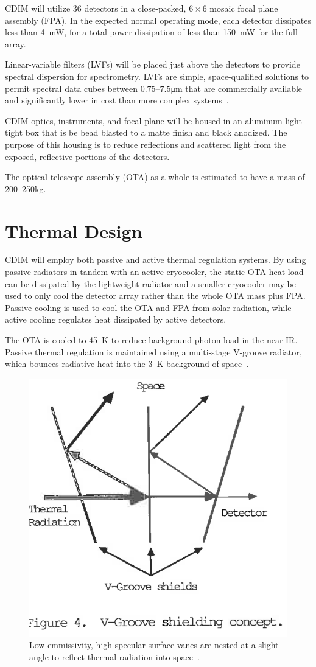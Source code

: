 \documentclass{ws-jai}
\begin{document}
CDIM will utilize 36 detectors in a close-packed, $6\times6$ mosaic focal plane assembly (FPA).
In the expected normal operating mode, each detector dissipates less than \SI{4}{\milli\watt}, for a total power dissipation of less than \SI{150}{\milli\watt} for the full array.

Linear-variable filters (LVFs) will be placed just above the detectors to provide spectral dispersion for spectrometry.
LVFs are simple, space-qualified solutions to permit spectral data cubes between $0.75$--$7.5$\si{\micro\meter} that are commercially available and significantly lower in cost than more complex systems~\cite{photonicsdotcom2016lvf}.

CDIM optics, instruments, and focal plane will be housed in an aluminum light-tight box that is be bead blasted to a matte finish and black anodized.
The purpose of this housing is to reduce reflections and scattered light from the exposed, reflective portions of the detectors.

The optical telescope assembly (OTA) as a whole is estimated to have a mass of 200--250\si{\kilo\gram}.

\section{Thermal Design}
\label{sec:thermal}
CDIM will employ both passive and active thermal regulation systems.
By using passive radiators in tandem with an active cryocooler, the static OTA heat load can be dissipated by the lightweight radiator and a smaller cryocooler may be used to only cool the detector array rather than the whole OTA mass plus FPA.\@
Passive cooling is used to cool the OTA and FPA from solar radiation, while active cooling regulates heat dissipated by active detectors.

The OTA is cooled to \SI{45}{\kelvin} to reduce background photon load in the near-IR.\@
Passive thermal regulation is maintained using a multi-stage V-groove radiator, which bounces radiative heat into the \SI{3}{\kelvin} background of space~\cite{bard_1987}.

\begin{figure}[!hb]
  \centering
  \includegraphics[width=.5\linewidth]{figs/vgroove-concept.png}
  \caption{Low emmissivity, high specular surface vanes are nested at a slight angle to reflect thermal radiation into space~\cite{rasbach1988}. }
\label{fig:v-groove}
\end{figure}
\end{document}

